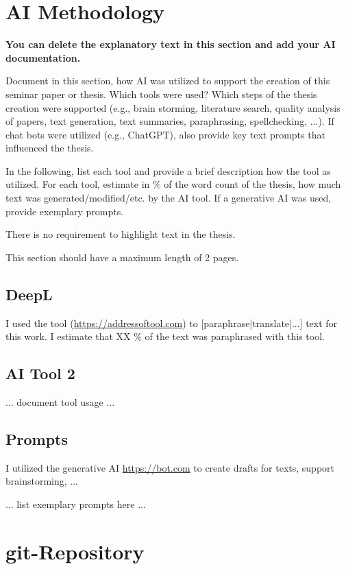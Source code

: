 \begin{appendices}


\section{AI Methodology}

\textbf{You can delete the explanatory text in this section and add your AI documentation.}

Document in this section, how AI was utilized to support the creation of this seminar paper or thesis. Which tools were used? Which steps of the thesis creation were supported (e.g., brain storming, literature search, quality analysis of papers, text generation, text summaries, paraphrasing, spellchecking, ...). If chat bots were utilized (e.g., ChatGPT), also provide key text prompts that influenced the thesis.

In the following, list each tool and provide a brief description how the tool as utilized. For each tool, estimate in \% of the word count of the thesis, how much text was generated/modified/etc. by the AI tool. If a generative AI was used, provide exemplary prompts.

There is no requirement to highlight text in the thesis.

This section should have a maximum length of 2 pages.

\subsection{DeepL} %
I used the tool (\url{https://addressoftool.com}) to [paraphrase|translate|...] text for this work.  I estimate that XX \% of the text was paraphrased with this tool. 

\subsection{AI Tool 2}
... document tool usage ...

\subsection{Prompts}
I utilized the generative AI \url{https://bot.com} to create drafts for texts, support brainstorming, ...

... list exemplary prompts here ...

\section{git-Repository}


\end{appendices}

